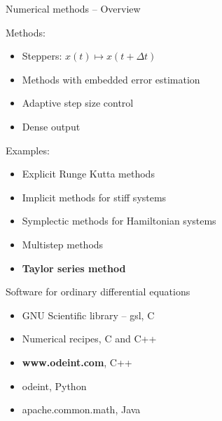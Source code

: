 \documentclass{beamer}
\newcommand{\rem}[1]{}
\begin{document}
\begin{frame}[fragile]{Numerical methods -- Overview}

Methods:
\begin{itemize}
 \item Steppers: $x(t) \mapsto x(t+\Delta t)$
 \item Methods with embedded error estimation
 \item Adaptive step size control
 \item Dense output
\end{itemize}

Examples:
\begin{itemize}
 \item Explicit Runge Kutta methods
 \item Implicit methods for stiff systems
 \item Symplectic methods for Hamiltonian systems
 \item Multistep methods
 \item {\bf Taylor series method}
\end{itemize}

\rem{
\begin{itemize}
 \item Explicit Runge Kutta methods: classical Runge Kutta 4, Runge-Kutta Cash Karp, Dormand-Prince methods
 \item Implicit methods for stiff systems: Rosenbrock, Radau solvers
 \item Symplectic methods for Hamiltonian system: Runge-Kutta Nystrom Methods
 \item Multistep methods: BDF, Adams-Bashforth-Moulton, Bulirsch Stoer
 \item {\bf Taylor series method}
\end{itemize}
}



\end{frame}




\begin{frame}[fragile]{Software for ordinary differential equations}

\begin{itemize} 
 \item GNU Scientific library -- gsl, C
 \item Numerical recipes, C and C++
 \item {\bf www.odeint.com}, C++
 \item odeint, Python
 \item apache.common.math, Java
\end{itemize}

\end{frame}
\end{document}
